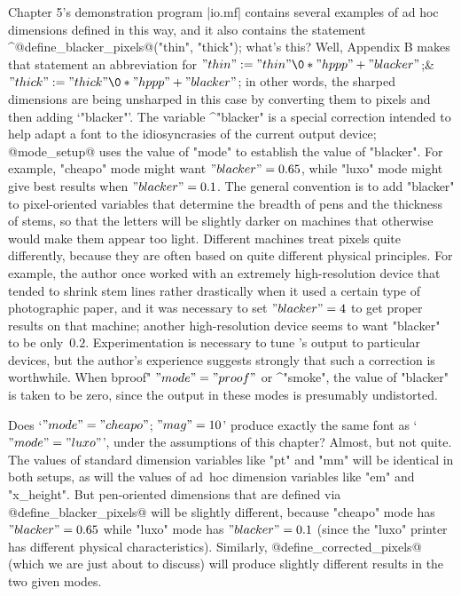 {{{{Chapter 5's demonstration program |io.mf| contains several examples of ad hoc
dimensions defined in this way, and it also contains the statement
\begindisplay
^@define\_blacker\_pixels@("thin", "thick");
\enddisplay
what's this? Well, Appendix B makes that statement an abbreviation for
\begindisplay
$"thin":="thin"\0\ast"hppp"+"blacker"$;&
$"thick":="thick"\0\ast"hppp"+"blacker"$;\cr
\enddisplay
in other words, the sharped dimensions are being unsharped in this case
by converting them to pixels and then adding `"blacker"'. The variable
^"blacker" is a special correction intended to help adapt a font to the
idiosyncrasies of the current output device; @mode\_setup@ uses the value
of "mode" to establish the value of "blacker". For example, "cheapo" mode
might want $"blacker"=0.65$, while "luxo" mode might give best results
when $"blacker"=0.1$. The general convention is to add "blacker" to
pixel-oriented variables that determine the breadth of pens and the
thickness of stems, so that the letters will be slightly darker on machines
that otherwise would make them appear too light. Different machines treat
pixels quite differently, because they are often based on quite different
physical principles. For example, the author once worked with an extremely
high-resolution device that tended to shrink stem lines rather drastically
when it used a certain type of photographic paper, and it was necessary
to set $"blacker"=4$ to get proper results on that machine; another
high-resolution device seems to want "blacker" to be only~$0.2$. Experimentation
is necessary to tune \MF's output to particular devices, but the author's
experience suggests strongly that such a correction is worthwhile. When
^^"proof" $"mode"="proof"$ or ^"smoke", the value of "blacker" is taken to
be zero, since the output in these modes is presumably undistorted.

\exercise Does `$"mode"="cheapo"$; $"mag"=10$' produce exactly the same
font as `$"mode"="luxo"$', under the assumptions of this chapter?
\answer Almost, but not quite. The values of standard dimension variables
like "pt" and "mm" will be identical in both setups, as will the values of
ad~hoc dimension variables like "em" and "x\_height". But pen-oriented
dimensions that are defined via @define\_blacker\_pixels@ will be slightly
different, because "cheapo" mode has $"blacker"=0.65$ while "luxo" mode
has $"blacker"=0.1$ (since the "luxo" printer has different physical
characteristics).  Similarly, @define\_corrected\_pixels@ (which we are
just about to discuss) will produce slightly different results in the two
given modes.

}}}}
